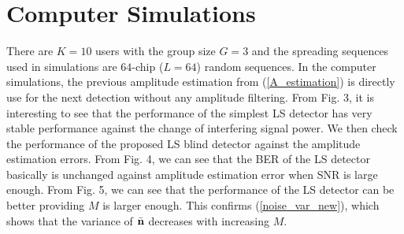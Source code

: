 \documentclass[a4paper,10pt,fleqn, twocolumn]{IEEETran}
\newcommand{\bn}{{\bf n}}
\begin{document}
\section{Computer Simulations}
\begin{figure} \label{BER_SNR}
\end{figure}
\begin{figure} \label{BER_A_SNR}
\end{figure}
\begin{figure}
\label{BER_M_SNR}
\end{figure}
There are $K=10$ users with the group size $G=3$ and the spreading
sequences used in simulations are $64$-chip ($L=64$) random
sequences. In the computer simulations, the previous amplitude
estimation from (\ref{A_estimation}) is directly use for the next
detection without any amplitude filtering. From Fig. 3, it is
interesting to see that the performance of the simplest LS
detector has very stable performance against the change of
interfering signal power. We then check the performance of the
proposed LS blind detector against the amplitude estimation
errors. From Fig. 4, we can see that the BER of the LS detector
basically is unchanged against amplitude estimation error when SNR
is large enough. From Fig. 5, we can see that the performance of
the LS detector can be better providing $M$ is larger enough. This
confirms (\ref{noise_var_new}), which shows that the variance of
$\bar{\bn}$ decreases with increasing $M$.
\end{document}
